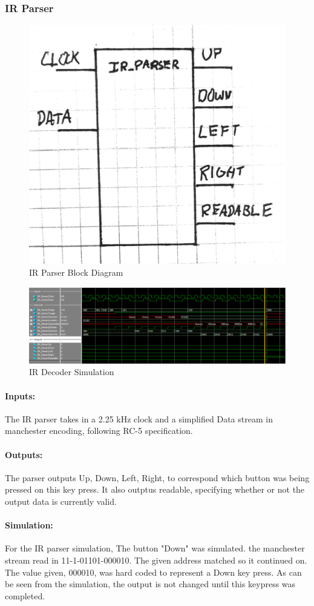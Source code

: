 \documentclass[]{article}
\begin{document}
\subsubsection{IR Parser}
\label{irparser}
\begin{figure}[H]\centering
    \includegraphics[width=0.5\linewidth]{figures/IR_Parser_Block.jpg}
    \caption{IR Parser Block Diagram}
    \label{fig:irParserBlock}
\end{figure}
\begin{figure}[H]\centering
    \includegraphics[width=\linewidth]{figures/IR_Parser_Sim.png}
    \caption{IR Decoder Simulation}
    \label{fig:irParserSim}
\end{figure}
\paragraph{Inputs:} The IR parser takes in a 2.25 kHz clock and a simplified Data stream in manchester encoding, following RC-5 specification.
\paragraph{Outputs:} The parser outputs Up, Down, Left, Right, to correspond which button was being pressed on this key press. It also outptus readable, specifying whether or not the output data is currently valid.
\paragraph{Simulation:} For the IR parser simulation, The button "Down" was simulated. the manchester stream read in 11-1-01101-000010. The given address matched so it continued on. The value given, 000010, was hard coded to represent a Down key press. As can be seen from the simulation, the output is not changed until this keypress was completed.
\end{document}
